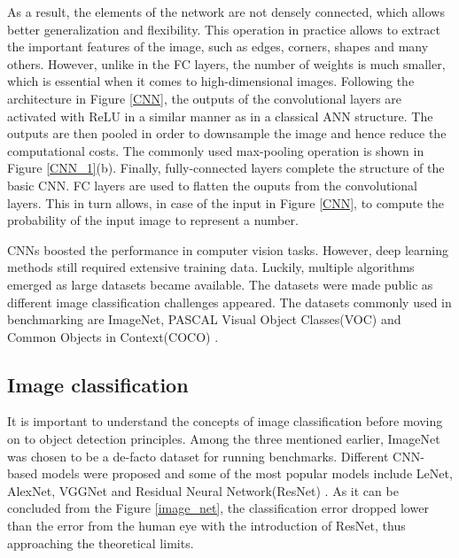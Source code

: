 \documentclass[english, 12pt, a4paper, elec, utf8, a-1b, online]{aaltothesis}
\begin{document}
As a result, the elements of the network  are not densely connected, which allows better generalization and flexibility. This operation in practice allows to extract the important features of the image, such as edges, corners, shapes and many others.  However, unlike in the FC layers, the number of weights is much smaller, which is essential when it comes to high-dimensional images. Following the architecture in Figure \ref{CNN}, the outputs of the convolutional layers are activated with ReLU in a similar manner as in a classical ANN structure. The outputs are then pooled in order to downsample the image and hence reduce the computational costs. \cite{Liu2016} The commonly used max-pooling operation is shown in Figure \ref{CNN_1}(b). Finally, fully-connected layers complete the structure of the basic CNN. FC layers are used to flatten the ouputs from the convolutional layers. This in turn allows, in case of the input in Figure \ref{CNN}, to compute the probability of the input image to represent a number. \cite{Mahony2019}

CNNs boosted the performance in computer vision tasks. However, deep learning methods still required extensive training data. Luckily, multiple algorithms emerged as large datasets became available. The datasets were made public as different image classification challenges appeared. The  datasets commonly used in benchmarking are ImageNet\cite{Russakovsky2014}, PASCAL Visual Object Classes(VOC)\cite{Everingham10} and Common Objects in Context(COCO) \cite{Lin2014}.

\subsection{Image classification}
It is important to understand the concepts of image classification before moving on to object detection principles. Among the three mentioned earlier, ImageNet was chosen to be a de-facto dataset for running benchmarks.  Different CNN-based models were proposed and some of the most popular models include LeNet\cite{lecun-gradientbased-learning-applied-1998}, AlexNet\cite{NIPS2012_c399862d}, VGGNet\cite{Simonyan2014} and Residual Neural Network(ResNet) \cite{He2015}. As it can be concluded from the Figure \ref{image_net}, the classification error dropped lower than the error from the human eye with the introduction of ResNet, thus approaching the theoretical limits. 
\end{document}
